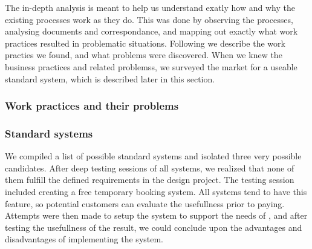 The in-depth analysis is meant to help us understand exatly how and why the 
existing processes work as they do. This was done by observing the processes,
analysing documents and correspondance, and mapping out exactly what work 
practices resulted in problematic situations. Following we describe the 
work practies we found, and what problems were discovered. When we knew the
business practices and related problemss, we surveyed the market for a useable 
standard system, which is described later in this section.

\subsubsection{Work practices and their problems}

\subsubsection{Standard systems}

We compiled a list of possible standard systems and isolated three very possible
candidates. After deep testing sessions of all systems, we realized that none
of them fulfill the defined requirements in the design project. The testing
session included creating a free temporary booking system. All systems tend to 
have this feature, so potential customers can evaluate the usefullness prior to 
paying. Attempts were then made to setup the system to support the needs of
\gomonkey, and after testing the usefullness of the result, we could conclude
upon the advantages and disadvantages of implementing the system.

